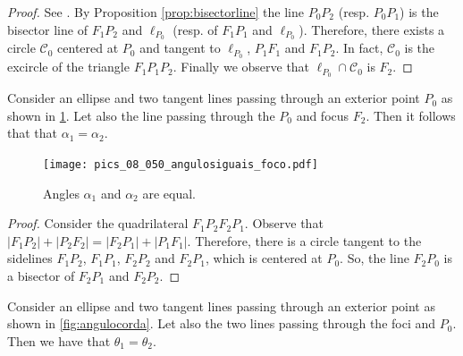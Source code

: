 \begin{proof} See \cite[page 10]{akopyan2007-conics}. By Proposition \ref{prop:bisectorline} the line  $P_0P_2$ (resp. $P_0P_1$) is  the bisector line of $F_1P_2$ and $\ell_{P_0}$ (resp. of $F_1P_1$ and $\ell_{P_0}$). Therefore, there exists a circle $\mathcal{C}_0$ centered at $P_0$ and tangent to $\ell_{P_0}$, $P_1F_1$ and $F_1P_2.$ In fact, $\mathcal{C}_0$ is the excircle of the triangle $F_1P_1P_2$.
Finally we observe that $\ell_{P_0}\cap \mathcal{C}_0$ is $F_2.$

\end{proof}
\begin{proposition} Consider an ellipse and two tangent lines passing through an exterior point $P_0$ as shown in   \cref{fig:angulofoco}. Let also the  line passing through the $P_0$ and   focus $F_2$.  Then it follows that that $\alpha_1=\alpha_2$. 
\end{proposition} 

\begin{figure}[H]
	\begin{center}
		 \texttt{[image: pics\_08\_050\_angulosiguais\_foco.pdf]}
		\caption {Angles $\alpha_1$ and $\alpha_2$ are equal. 	\label{fig:angulofoco} }
	\end{center}

\end{figure}

\begin{proof} Consider the quadrilateral $F_1P_2F_2P_1.$
Observe that $|F_1P_2|+|P_2F_2|=|F_2P_1|+|P_1F_1|. $
Therefore, there is a circle tangent to the sidelines $F_1P_2$, $F_1P_1$, $F_2P_2$ and $F_2P_1$, which is centered at $P_0.$ So, the line $F_2P_0$ is a bisector of $F_2P_1$ and $F_2P_2.$
\end{proof}



\begin{proposition} Consider an ellipse and two tangent lines passing through an exterior point as shown in    \cref{fig:angulocorda}. Let also the two lines passing through the foci and $P_0$.  Then  we have that $\theta_1=\theta_2$. 
\end{proposition} 

